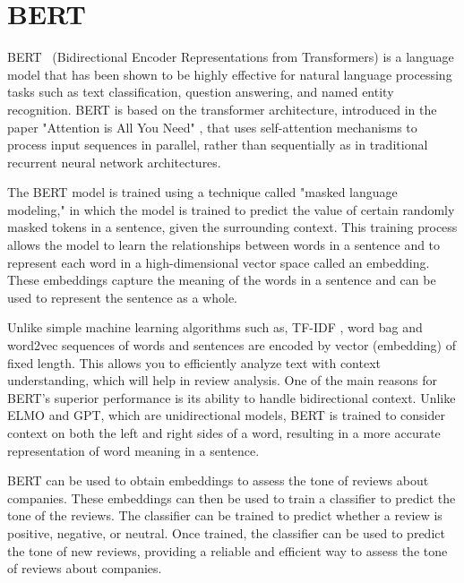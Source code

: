 \documentclass[PI]{ProjectProposal}
\begin{document}
\section{BERT}
\label{sec:org8f3ff8c}
BERT~\autocite{devlin2018bert} (Bidirectional Encoder Representations from Transformers) is a language model that has been shown to be highly effective for natural language processing tasks such as text classification, question answering, and named entity recognition. BERT is based on the transformer architecture, introduced in the paper "Attention is All You Need" \autocite{NIPS2017_3f5ee243}, that uses self-attention mechanisms to process input sequences in parallel, rather than sequentially as in traditional recurrent neural network architectures.

The BERT model is trained using a technique called "masked language modeling," in which the model is trained to predict the value of certain randomly masked tokens in a sentence, given the surrounding context. This training process allows the model to learn the relationships between words in a sentence and to represent each word in a high-dimensional vector space called an embedding. These embeddings capture the meaning of the words in a sentence and can be used to represent the sentence as a whole.

Unlike simple machine learning algorithms such as, TF-IDF \autocite{jones1972statistical}, word bag\autocite{doi:10.1080/00437956.1954.11659520} and word2vec \autocite{mikolov2013efficient} sequences of words and sentences are encoded by vector (embedding) of fixed length. This allows you to efficiently analyze text with context understanding, which will help in review analysis.
One of the main reasons for BERT's superior performance is its ability to handle bidirectional context. Unlike ELMO \autocite{elmo} and GPT\autocite{radford2019language}, which are unidirectional models, BERT is trained to consider context on both the left and right sides of a word, resulting in a more accurate representation of word meaning in a sentence.

BERT can be used to obtain embeddings to assess the tone of reviews about companies. These embeddings can then be used to train a classifier to predict the tone of the reviews. The classifier can be trained to predict whether a review is positive, negative, or neutral. Once trained, the classifier can be used to predict the tone of new reviews, providing a reliable and efficient way to assess the tone of reviews about companies.
\end{document}
